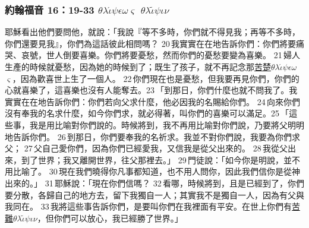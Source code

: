 \subsubsection{約翰福音 16：19-33 $\theta$$\lambda$$\acute{\iota}$$\psi$$\epsilon$$\omega$$\varsigma$ $\theta$$\lambda$$\tilde{\iota}$$\psi$$\iota$$\nu$}
耶穌看出他們要問他，就說：「我說『等不多時，你們就不得見我；再等不多時，你們還要見我』，你們為這話彼此相問嗎？ 20 我實實在在地告訴你們：你們將要痛哭、哀號，世人倒要喜樂。你們將要憂愁，然而你們的憂愁要變為喜樂。 21 婦人生產的時候就憂愁，因為她的時候到了；既生了孩子，就不再記念那\underline{苦楚$\theta$$\lambda$$\acute{\iota}$$\psi$$\epsilon$$\omega$$\varsigma$}，因為歡喜世上生了一個人。 22 你們現在也是憂愁，但我要再見你們，你們的心就喜樂了，這喜樂也沒有人能奪去。23 「到那日，你們什麼也就不問我了。我實實在在地告訴你們：你們若向父求什麼，他必因我的名賜給你們。 24 向來你們沒有奉我的名求什麼，如今你們求，就必得著，叫你們的喜樂可以滿足。25 「這些事，我是用比喻對你們說的。時候將到，我不再用比喻對你們說，乃要將父明明地告訴你們。 26 到那日，你們要奉我的名祈求。我並不對你們說，我要為你們求父； 27 父自己愛你們，因為你們已經愛我，又信我是從父出來的。 28 我從父出來，到了世界；我又離開世界，往父那裡去。」 29 門徒說：「如今你是明說，並不用比喻了。 30 現在我們曉得你凡事都知道，也不用人問你，因此我們信你是從神出來的。」 31 耶穌說：「現在你們信嗎？ 32 看哪，時候將到，且是已經到了，你們要分散，各歸自己的地方去，留下我獨自一人；其實我不是獨自一人，因為有父與我同在。 33 我將這些事告訴你們，是要叫你們在我裡面有平安。在世上你們有\underline{苦難$\theta$$\lambda$$\tilde{\iota}$$\psi$$\iota$$\nu$}，但你們可以放心，我已經勝了世界。」


